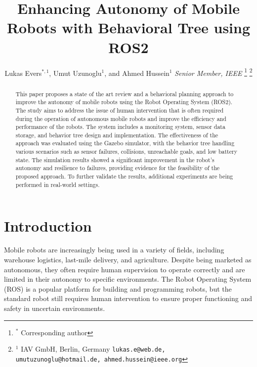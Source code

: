 \documentclass[letterpaper, 10pt, conference]{ieeeconf}
\begin{document}
\title{Enhancing Autonomy of Mobile Robots with Behavioral Tree using ROS2}

\author{Lukas Evers$^{*,1}$, Umut Uzunoglu$^{1}$, and Ahmed Hussein$^{1}$ \textit{Senior Member, IEEE}%
    \thanks{$^{*}$ Corresponding author }%
    \thanks{$^{1}$ IAV GmbH, Berlin, Germany \newline
		{\tt\small lukas.e@web.de, umutuzunoglu@hotmail.de, ahmed.hussein@ieee.org}}%
}

\maketitle
\pagestyle{empty}


\begin{abstract}

This paper proposes a state of the art review and a behavioral planning approach to improve the autonomy of mobile robots using the Robot Operating System (ROS2). The study aims to address the issue of human intervention that is often required during the operation of autonomous mobile robots and improve the efficiency and performance of the robots. The system includes a monitoring system, sensor data storage, and behavior tree design and implementation. The effectiveness of the approach was evaluated using the Gazebo simulator, with the behavior tree handling various scenarios such as sensor failures, collisions, unreachable goals, and low battery state. The simulation results showed a significant improvement in the robot's autonomy and resilience to failures, providing evidence for the feasibility of the proposed approach. To further validate the results, additional experiments are being performed in real-world settings.

\end{abstract}


\section{Introduction}
\label{sec:Introduction}

Mobile robots are increasingly being used in a variety of fields, including warehouse logistics, last-mile delivery, and agriculture. Despite being marketed as autonomous, they often require human supervision to operate correctly and are limited in their autonomy to specific environments. The Robot Operating System (ROS) is a popular platform for building and programming robots, but the standard robot still requires human intervention to ensure proper functioning and safety in uncertain environments.
\end{document}
